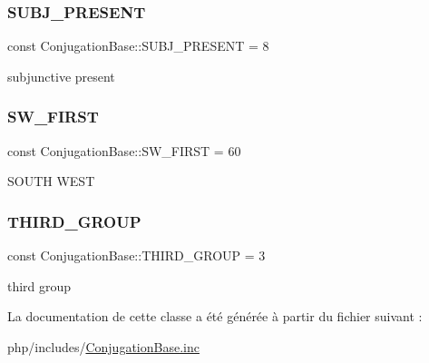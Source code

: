 \subsubsection{\texorpdfstring{S\+U\+B\+J\+\_\+\+P\+R\+E\+S\+E\+NT}{SUBJ\_PRESENT}}
{\footnotesize\ttfamily const Conjugation\+Base\+::\+S\+U\+B\+J\+\_\+\+P\+R\+E\+S\+E\+NT = 8}

subjunctive present \hypertarget{class_conjugation_base_aadfcc5e449ab900e86244bcfdd8add79}{}\label{class_conjugation_base_aadfcc5e449ab900e86244bcfdd8add79} 
\subsubsection{\texorpdfstring{S\+W\+\_\+\+F\+I\+R\+ST}{SW\_FIRST}}
{\footnotesize\ttfamily const Conjugation\+Base\+::\+S\+W\+\_\+\+F\+I\+R\+ST = 60}

S\+O\+U\+TH W\+E\+ST \hypertarget{class_conjugation_base_a15fb84852952c270f80139517000d263}{}\label{class_conjugation_base_a15fb84852952c270f80139517000d263} 
\subsubsection{\texorpdfstring{T\+H\+I\+R\+D\+\_\+\+G\+R\+O\+UP}{THIRD\_GROUP}}
{\footnotesize\ttfamily const Conjugation\+Base\+::\+T\+H\+I\+R\+D\+\_\+\+G\+R\+O\+UP = 3}

third group 

La documentation de cette classe a été générée à partir du fichier suivant \+:\begin{DoxyCompactItemize}
\item 
php/includes/\hyperlink{_conjugation_base_8inc}{Conjugation\+Base.\+inc}\end{DoxyCompactItemize}
